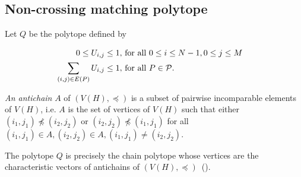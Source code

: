 \documentclass[11pt]{article}
\theoremstyle{plain}%
\theoremstyle{definition} \newtheorem{lem}{Lemma}[section]
\theoremstyle{definition} \newtheorem{claim}{Claim}[lem]
\theoremstyle{definition} \newtheorem{theorem}{Theorem}[section]
\theoremstyle{definition} \newtheorem{exo}{Exercice n$^\circ$}
\theoremstyle{definition} \newtheorem{quest}{}[exo]
\theoremstyle{definition} \newtheorem{sousquest}{}[quest]
\theoremstyle{remark}
\theoremstyle{definition}
\begin{document}
%
%










\subsection{Non-crossing matching polytope}\label{NonCross}

Let $Q$ be the polytope defined by 

\begin{eqnarray}
0 \le U_{i,j} \le 1,& \textrm{ for all } 0 \le i \le N-1, 0 \le j \le M &\label{positivite}\\
 \sum_{(i, j) \in E(P)} U_{i,j} \le 1,& \textrm{ for all } P \in {\cal P}. &\label{antichaine}
\end{eqnarray}

{\it An antichain} $A$ of $(V(H),\preceq)$ is a subset of pairwise incomparable elements of $V(H)$, i.e. $A$ is the set of vertices of $V(H)$ such that either $(i_1,j_1)\npreceq (i_2,j_2)$ or $(i_2,j_2)\npreceq (i_1,j_1)$ for all $(i_1,j_1)\in A, (i_2,j_2) \in A,(i_1,j_1)\neq (i_2,j_2)$.

The polytope $Q$ is precisely the chain polytope whose vertices are the characteristic vectors of antichains of $(V(H),\preceq)$~(\cite{Sch}).
\end{document}
